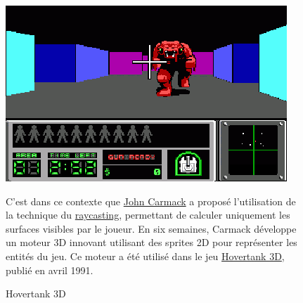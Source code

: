 \documentclass[12pt]{report}
\begin{document}
\begin{figure}[H]
	\begin{minipage}{0.48\textwidth}
		\centering
		\includegraphics[width=\linewidth]{image/Hovertank_3D.png}
		\hspace*{-0.5cm}
		\caption{Hovertank 3D}
		\label{fig:hovertank3d}
	\end{minipage}\hfill
	\begin{minipage}{0.48\textwidth}
		C'est dans ce contexte que \href{https://fr.wikipedia.org/wiki/John_Carmack}{John Carmack} a 
		proposé l'utilisation de la technique du \href{https://fr.wikipedia.org/wiki/Raycasting}{raycasting}, permettant 
		de calculer uniquement les surfaces visibles par le joueur. En six semaines, Carmack développe un moteur 3D innovant 
		utilisant des sprites 2D pour représenter les entités du jeu. Ce moteur a été utilisé dans le jeu 
		\href{https://fr.wikipedia.org/wiki/Hovertank_3D}{Hovertank 3D}, publié en avril 1991.
	\end{minipage}
\end{figure}
\end{document}
